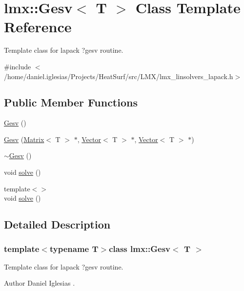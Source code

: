 \hypertarget{classlmx_1_1Gesv}{\section{lmx\-:\-:Gesv$<$ T $>$ Class Template Reference}
\label{classlmx_1_1Gesv}
}


Template class for lapack ?gesv routine.  




{\ttfamily \#include $<$/home/daniel.\-iglesias/\-Projects/\-Heat\-Surf/src/\-L\-M\-X/lmx\-\_\-linsolvers\-\_\-lapack.\-h$>$}

\subsection*{Public Member Functions}
\begin{DoxyCompactItemize}
\item 
\hyperlink{classlmx_1_1Gesv_ab356e79c38de4c7a8e2ce96ffb57d168}{Gesv} ()
\item 
\hyperlink{classlmx_1_1Gesv_a158ad000c6d51dc107fa33043e8e9c24}{Gesv} (\hyperlink{classlmx_1_1Matrix}{Matrix}$<$ T $>$ $\ast$, \hyperlink{classlmx_1_1Vector}{Vector}$<$ T $>$ $\ast$, \hyperlink{classlmx_1_1Vector}{Vector}$<$ T $>$ $\ast$)
\item 
\hyperlink{classlmx_1_1Gesv_ae7e96df048df537bad3274b358f3876c}{$\sim$\-Gesv} ()
\item 
void \hyperlink{classlmx_1_1Gesv_ab1258532e8cecfca1c2fe8fad913bf4d}{solve} ()
\item 
{\footnotesize template$<$$>$ }\\void \hyperlink{classlmx_1_1Gesv_a2234bdb4da0bddaac06aca68e134f8df}{solve} ()
\end{DoxyCompactItemize}


\subsection{Detailed Description}
\subsubsection*{template$<$typename T$>$class lmx\-::\-Gesv$<$ T $>$}

Template class for lapack ?gesv routine. 

\begin{DoxyAuthor}{Author}
Daniel Iglesias . 
\end{DoxyAuthor}


